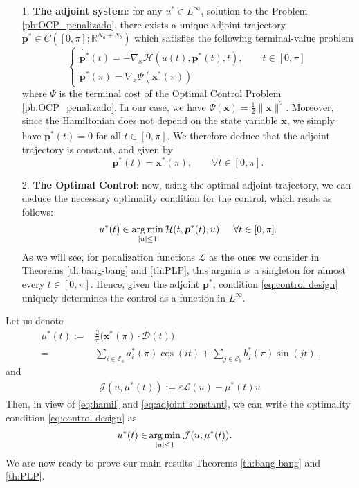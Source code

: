 \documentclass[twocolumn]{autart}    %
\begin{document}
\begin{itemize}
	\item[1.] \textbf{The adjoint system}: for any $u^\ast \in L^\infty$, solution to the Problem \ref{pb:OCP_penalizado}, there exists a unique adjoint trajectory $\bm{p}^\ast\in C([0,\pi]; \mathbb{R}^{N_a+N_b})$ which satisfies the following terminal-value problem
    \begin{equation*}
    	\begin{cases}
    		\dot{\bm{p}^\ast}(t) = -\nabla_x \mathcal{H}(u(t),\bm{p}^\ast(t),t), \qquad t \in [0,\pi] 
    		\\[5pt]
    		\bm{p}^\ast (\pi) = \nabla_x \Psi (\bm{x}^\ast (\pi))
    	\end{cases}
    \end{equation*}
    where $\Psi$ is the terminal cost of the Optimal Control Problem \ref{pb:OCP_penalizado}. In our case, we have $\Psi (\bm{x}) = \frac{1}{2} \| \bm{x}\|^2$. Moreover, since the Hamiltonian does not depend on the state variable $\bm{x}$, we simply have $\dot{\bm{p}^\ast}(t) = 0$ for all $t \in [0,\pi]$. We therefore deduce that the adjoint trajectory is constant, and given by
    \begin{equation}\label{eq:adjoint constant}
		\bm{p}^\ast (t) = \bm{x}^\ast (\pi), \qquad \forall t \in [0,\pi]. 
	\end{equation}
    
    \item[2.] \textbf{The Optimal  Control}: now, using the optimal adjoint trajectory, we can deduce the necessary optimality condition for the control, which reads as follows:
    \begin{align}\label{eq:control design}
    	u^* (t) \in \operatorname*{arg\,min}_{|u|\leq 1} \mathcal{H}(t,\bm{p}^*(t),u), \quad \forall t \in [0,\pi].
    \end{align}
    As we will see, for penalization functions $\mathcal{L}$ as the ones we consider in Theorems \ref{th:bang-bang} and \ref{th:PLP}, this argmin is a singleton for almost every $t\in [0,\pi]$. Hence, given the adjoint $\bm{p}^\ast$,  condition \eqref{eq:control design} uniquely determines the control as a function in $L^\infty$.
\end{itemize}
Let us denote 
\begin{align}\label{eq:m ast}
	\mu^\ast (t) := & \frac 2\pi \big(\bm{x}^*(\pi) \cdot \bm{\mathcal{D}}(t)\big) 
	\\[5pt]
	= & \sum_{i \in \mathcal{E}_a} a^*_i (\pi) \cos(it) + \sum_{j \in \mathcal{E}_b} b^*_j (\pi) \sin(jt). \nonumber
\end{align}
and
\begin{align}\label{eq:functionalJ}
	\mathcal{J} (u,\mu^\ast(t)):= \varepsilon \mathcal{L}(u) - \mu^\ast(t) u 
\end{align}    
Then, in view of \eqref{eq:hamil} and \eqref{eq:adjoint constant}, we can write the optimality condition \eqref{eq:control design} as
\begin{align}\label{eq:control design2}
    u^\ast(t)  \in & \operatorname*{arg\,min}_{|u|\leq 1}  \mathcal{J} (u,\mu^\ast(t)).  
\end{align}    
We are now ready to prove our main results Theorems \ref{th:bang-bang} and \ref{th:PLP}.
\end{document}
